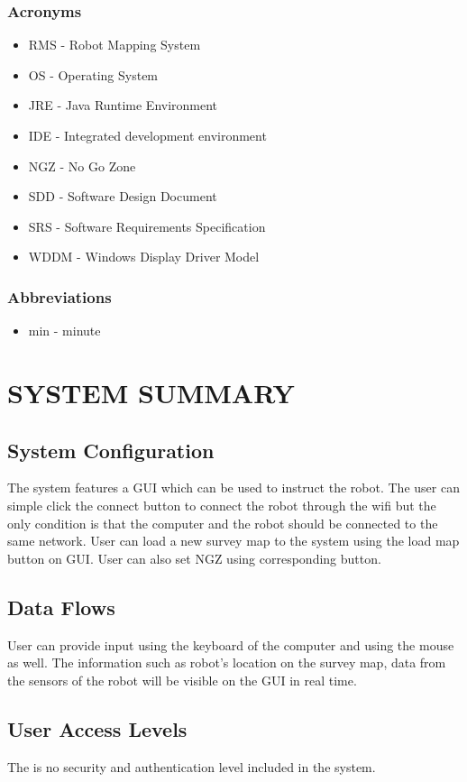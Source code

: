 \documentclass[10pt,a4paper,titlepage]{article}
\begin{document}
\subsubsection{Acronyms}
\begin{itemize}
\item RMS - Robot Mapping System
\item OS - Operating System
\item JRE - Java Runtime Environment
\item IDE - Integrated development environment
\item NGZ - No Go Zone
\item SDD - Software Design Document
\item SRS - Software Requirements Specification
\item WDDM - Windows Display Driver Model
\end{itemize}

\subsubsection{Abbreviations}
\begin{itemize}
	\item min - minute
\end{itemize}
    \newpage    
	\section{SYSTEM SUMMARY}
		\subsection{System Configuration}
        The system features a GUI which can be used to instruct the robot. The user can simple click the connect button to connect the robot through the wifi but the only condition is that the  computer and the robot should be connected to the same network. User can load a new survey map to the system using the load map button on GUI. User can also set NGZ using corresponding button. 
        \subsection{Data Flows}
        User can provide input using the keyboard of the computer and using the mouse as well. The information such as robot's location on the survey map, data from the sensors of the robot will be visible on the GUI in real time.
        \subsection{User Access Levels}
        The is no security and authentication level included in the system.
\end{document}
